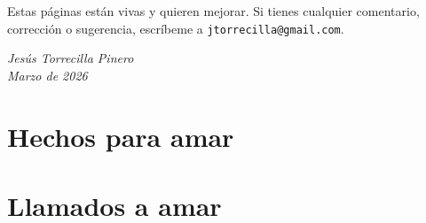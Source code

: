 \documentclass[11pt]{book}
\begin{document}
Estas páginas están vivas y quieren mejorar. Si tienes cualquier comentario, corrección o sugerencia, escríbeme a \texttt{jtorrecilla@gmail.com}.

\vspace{2em}

\begin{flushright}
\textit{Jesús Torrecilla Pinero}\\
\textit{Marzo de 2026}
\end{flushright}

\part{Hechos para amar}








\part{Llamados a amar}









\end{document}
